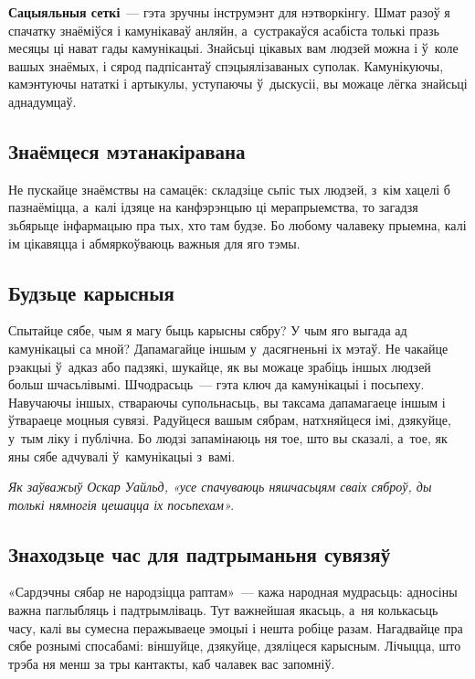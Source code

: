 \textbf{Сацыяльныя сеткі}~--- гэта зручны інструмэнт для нэтворкінгу. Шмат разоў я спачатку знаёміўся і камунікаваў анляйн, а~сустракаўся асабіста толькі празь месяцы ці нават гады камунікацыі. Знайсьці цікавых вам людзей можна і ў~коле вашых знаёмых, і сярод падпісантаў спэцыялізаваных суполак. Камунікуючы, камэнтуючы нататкі і артыкулы, уступаючы ў~дыскусіі, вы можаце лёгка знайсьці аднадумцаў.

\subsection*{Знаёмцеся мэтанакіравана}

Не пускайце знаёмствы на самацёк: складзіце сьпіс тых людзей, з~кім хацелі б пазнаёміцца, а~калі ідзяце на канфэрэнцыю ці мерапрыемства, то загадзя зьбярыце інфармацыю пра тых, хто там будзе. Бо любому чалавеку прыемна, калі ім цікавяцца і абмяркоўваюць важныя для яго тэмы.

\subsection*{Будзьце карысныя}

Спытайце сябе, чым я магу быць карысны сябру? У чым яго выгада ад камунікацыі са мной? Дапамагайце іншым у~дасягненьні іх мэтаў. Не чакайце рэакцыі ў~адказ або падзякі, шукайце, як вы можаце зрабіць іншых людзей больш шчасьлівымі. Шчодрасьць~--- гэта ключ да камунікацыі і посьпеху. Навучаючы іншых, ствараючы супольнасьць, вы таксама дапамагаеце іншым і ўтвараеце моцныя сувязі. Радуйцеся вашым сябрам, натхняйцеся імі, дзякуйце, у~тым ліку і публічна. Бо людзі запамінаюць ня тое, што вы сказалі, а~тое, як яны сябе адчувалі ў~камунікацыі з~вамі.

\emph{Як заўважыў Оскар Уайльд, «усе спачуваюць няшчасьцям сваіх сяброў, ды толькі нямногія цешацца іх посьпехам».}

\subsection*{Знаходзьце час для падтрыманьня сувязяў}

«Сардэчны сябар не народзіцца раптам»~--- кажа народная мудрасьць: адносіны важна паглыбляць і падтрымліваць. Тут важнейшая якасьць, а~ня колькасьць часу, калі вы сумесна перажываеце эмоцыі і нешта робіце разам. Нагадвайце пра сябе рознымі спосабамі: віншуйце, дзякуйце, дзяліцеся карысным. Лічыцца, што трэба ня менш за тры кантакты, каб чалавек вас запомніў.

